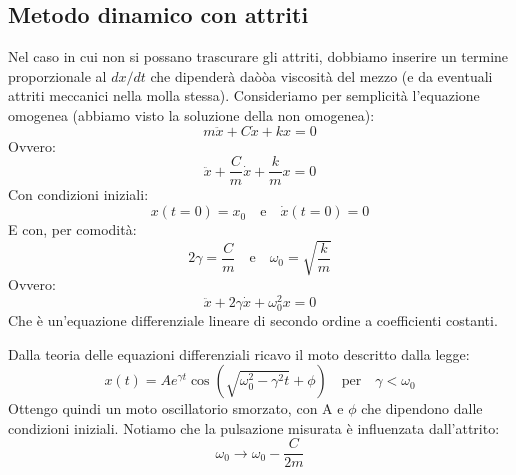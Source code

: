 \documentclass[a4paper,12pt]{article}
\begin{document}
\subsection{Metodo dinamico con attriti}
Nel caso in cui non si possano trascurare gli attriti, dobbiamo inserire un termine proporzionale al
$dx/dt$ che dipenderà daòòa viscosità del mezzo (e da eventuali attriti meccanici nella molla stessa).
Consideriamo per semplicità l'equazione omogenea (abbiamo visto la soluzione della non omogenea):
$$
m\ddot{x} + C\dot{x} + kx = 0
$$
Ovvero:
$$
\ddot{x} + \frac{C}{m} \dot{x} + \frac{k}{m} x = 0
$$
Con condizioni iniziali:
$$
x(t=0) = x_0 \quad \text{e} \quad \dot{x}(t=0) = 0
$$
E con, per comodità:
$$
2\gamma = \frac{C}{m} \quad \text{e} \quad \omega_0 = \sqrt{\frac{k}{m}}
$$
Ovvero:
$$
\ddot{x} + 2\gamma \dot{x} + \omega_0^2 x = 0
$$
Che è un'equazione differenziale lineare di secondo ordine a coefficienti costanti.

Dalla teoria delle equazioni differenziali ricavo il moto descritto dalla legge:
$$
x(t) = A e^{\gamma t} \cos(\sqrt{\omega_0^2 - \gamma^2 t} + \phi) \quad \text{per} \quad \gamma < \omega_0
$$
Ottengo quindi un moto oscillatorio smorzato, con A e $\phi$ che dipendono dalle condizioni iniziali.
Notiamo che la pulsazione misurata è influenzata dall'attrito:
$$
\omega_0 \to \omega_0 - \frac{C}{2m}
$$

\newpage
\end{document}
